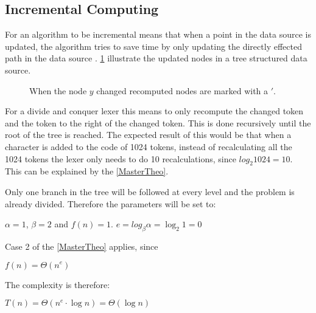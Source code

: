 \subsection{Incremental Computing}
For an algorithm to be incremental means that when a point in the data source
is updated, the algorithm tries to save time by only updating the directly effected
path in the data source \cite{incrementalDef}. \cref{fig:incUp} illustrate
the updated nodes in a tree structured data source.

\begin{figure}[!htp]
\centering
\caption{When the node $y$ changed recomputed nodes are marked with a $'$. \label{fig:incUp}}
\end{figure}

For a divide and conquer lexer this means to only recompute the changed token
and the token to the right of the changed token. This is done recursively until
the root of the tree is reached. The expected result of this would be that when
a character is added to the code of 1024 tokens, instead of recalculating all
the 1024 tokens the lexer only needs to do 10 recalculations, since
$log_2 1024 = 10$. This can be explained by the \cref{MasterTheo}.

Only one branch in the tree will be followed at every level and the problem is
already divided. Therefore the parameters will be set to:
\begin{center}
$\alpha = 1$, $\beta = 2$ and $f(n) = 1$.
$e=log_\beta\alpha=\log_2 1=0$
\end{center}
Case 2 of the \cref{MasterTheo} applies, since
\begin{center}
$f(n) = \Theta(n^e)$
\end{center}
The complexity is therefore:
\begin{center}
$T(n) = \Theta(n^e \cdot \log n) = \Theta(\log n)$
\end{center}

